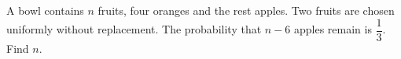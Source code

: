 A bowl contains $n$ fruits, four oranges and the rest apples. Two fruits are chosen uniformly without replacement. The probability that $n-6$ apples remain is $\dfrac{1}{3}$. Find $n$.
